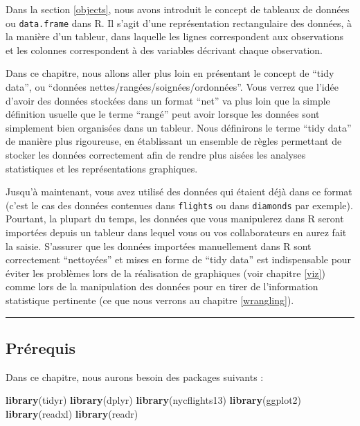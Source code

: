 \documentclass[
  a4paper,
]{article}
\newenvironment{Shaded}{\begin{snugshade}}{\end{snugshade}}
\newcommand{\KeywordTok}[1]{\textcolor[rgb]{0.12,0.11,0.11}{\textbf{#1}}}
\newcommand{\NormalTok}[1]{\textcolor[rgb]{0.12,0.11,0.11}{#1}}
\begin{document}
Dans la section \ref{objects}, nous avons introduit le concept de tableaux de données ou \texttt{data.frame} dans R. Il s'agit d'une représentation rectangulaire des données, à la manière d'un tableur, dans laquelle les lignes correspondent aux observations et les colonnes correspondent à des variables décrivant chaque observation.

Dans ce chapitre, nous allons aller plus loin en présentant le concept de ``tidy data'', ou ``données nettes/rangées/soignées/ordonnées''. Vous verrez que l'idée d'avoir des données stockées dans un format ``net'' va plus loin que la simple définition usuelle que le terme ``rangé'' peut avoir lorsque les données sont simplement bien organisées dans un tableur. Nous définirons le terme ``tidy data'' de manière plus rigoureuse, en établissant un ensemble de règles permettant de stocker les données correctement afin de rendre plus aisées les analyses statistiques et les représentations graphiques.

Jusqu'à maintenant, vous avez utilisé des données qui étaient déjà dans ce format (c'est le cas des données contenues dans \texttt{flights} ou dans \texttt{diamonds} par exemple). Pourtant, la plupart du temps, les données que vous manipulerez dans R seront importées depuis un tableur dans lequel vous ou vos collaborateurs en aurez fait la saisie. S'assurer que les données importées manuellement dans R sont correctement ``nettoyées'' et mises en forme de ``tidy data'' est indispensable pour éviter les problèmes lors de la réalisation de graphiques (voir chapitre \ref{viz}) comme lors de la manipulation des données pour en tirer de l'information statistique pertinente (ce que nous verrons au chapitre \ref{wrangling}).

\begin{center}\rule{0.5\linewidth}{0.5pt}\end{center}

\hypertarget{prerek}{%
\subsection{Prérequis}\label{prerek}}

Dans ce chapitre, nous aurons besoin des packages suivants :

\begin{Shaded}
\begin{Highlighting}[]
\KeywordTok{library}\NormalTok{(tidyr)}
\KeywordTok{library}\NormalTok{(dplyr)}
\KeywordTok{library}\NormalTok{(nycflights13)}
\KeywordTok{library}\NormalTok{(ggplot2)}
\KeywordTok{library}\NormalTok{(readxl)}
\KeywordTok{library}\NormalTok{(readr)}
\end{Highlighting}
\end{Shaded}
\end{document}
